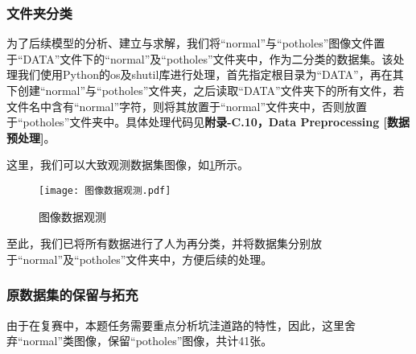 \documentclass{MathorCupmodeling}
\begin{document}
\begin{table}[H]
	\centering
	\caption{异常标注图片的处理}
	\label{tab:异常图片处理}
\end{table}

  
	\subsubsection{文件夹分类}
	为了后续模型的分析、建立与求解，我们将“normal”与“potholes”图像文件置于“DATA”文件下的“normal”及“potholes”文件夹中，作为二分类的数据集。该处理我们使用Python的os及shutil库进行处理，首先指定根目录为“DATA”，再在其下创建“normal”与“potholes”文件夹，之后读取“DATA”文件夹下的所有文件，若文件名中含有“normal”字符，则将其放置于“normal”文件夹中，否则放置于“potholes”文件夹中。具体处理代码见\textbf{附录-C.10，Data Preprocessing [数据预处理]}。
	
	这里，我们可以大致观测数据集图像，如\textcolor{blue}{\cref{fig:图像数据观测}}所示。
	\begin{figure}[H]
		\centering
		\texttt{[image: 图像数据观测.pdf]}
		\caption{图像数据观测}
		\label{fig:图像数据观测}
	\end{figure}
	至此，我们已将所有数据进行了人为再分类，并将数据集分别放于“normal”及“potholes”文件夹中，方便后续的处理。
	
	\subsubsection{原数据集的保留与拓充}
	由于在复赛中，本题任务需要重点分析坑洼道路的特性，因此，这里舍弃“normal”类图像，保留“potholes”图像，共计41张。
\end{document}
